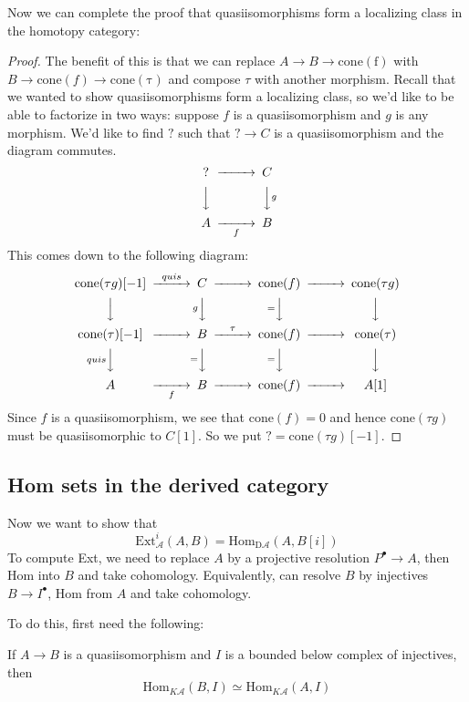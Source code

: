 Now we can complete the proof that quasiisomorphisms form a localizing class in the homotopy category:
\begin{proof}
    The benefit of this is that we can replace $A\rightarrow B\rightarrow \mathrm{cone(f)}$ with $B\rightarrow \mathrm{cone}(f)\rightarrow \mathrm{cone(\tau)}$ and compose $\tau$ with another morphism. Recall that we wanted to show quasiisomorphisms form a localizing class, so we'd like to be able to factorize in two ways: suppose $f$ is a quasiisomorphism and $g$ is any morphism. We'd like to find $?$ such that $?\rightarrow C$ is a quasiisomorphism and the diagram commutes.
    $$\begin{CD} ? @> > > C \\ @VVV @VVgV \\ A @> > f> B\end{CD}$$
    This comes down to the following diagram: 
    $$\begin{CD} \mathrm{cone}(\tau g)[-1]@> quis> > C @> > > \mathrm{cone}(f) @> > > \mathrm{cone}(\tau g)\\ @VVV @VgVV @V=VV @VVV \\ \mathrm{cone(\tau)[-1]}@> > > B @> \tau> > \mathrm{cone}(f)@> > > \mathrm{cone}(\tau) \\ @VquisVV @V=VV @V=VV @VVV \\ A @> > f > B @> > > \mathrm{cone}(f)@> > > A[1]\end{CD}$$
    Since $f$ is a quasiisomorphism, we see that $\mathrm{cone}(f)=0$ and hence $\mathrm{cone}(\tau g)$ must be quasiisomorphic to $C[1]$. So we put $?=\mathrm{cone}(\tau g)[-1]$.
\end{proof} 

\subsection{Hom sets in the derived category}

Now we want to show that $$\mathrm{Ext}_{\mathcal{A}}^i(A,B)=\mathrm{Hom_{D \mathcal{A}}}(A, B[i])$$
To compute Ext, we need to replace $A$ by a projective resolution $P^\bullet \rightarrow A$, then Hom into $B$ and take cohomology. Equivalently, can resolve $B$ by injectives $B\rightarrow I^\bullet$, Hom from $A$ and take cohomology.

To do this, first need the following: 

\begin{proposition}{}{}
     If $A\rightarrow B$ is a quasiisomorphism and $I$ is a bounded below complex of injectives, then $$\mathrm{Hom}_{K\mathcal{A}}(B,I)\simeq \mathrm{Hom}_{K\mathcal{A}}(A,I)$$
\end{proposition}

